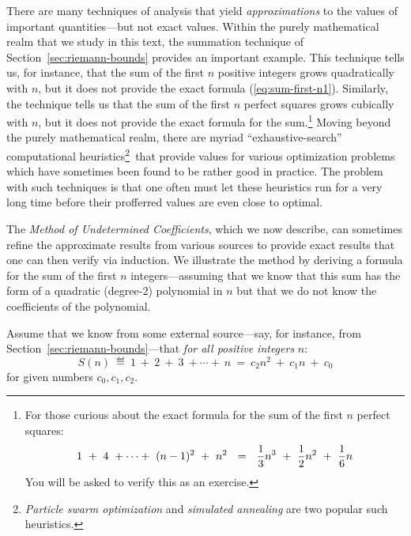 \medskip


There are many techniques of analysis that yield {\em approximations} to the values of important quantities---but not exact values.  Within the purely mathematical realm that we study in this text, the summation technique of Section~\ref{sec:riemann-bounds} provides an important example.  This technique tells us, for instance, that the sum of the first $n$ positive integers grows quadratically with $n$, but it does not provide the exact formula (\ref{eq:sum-first-n1}).   Similarly, the technique tells us that the sum of the first $n$ perfect squares grows cubically with $n$, but it does not provide the exact formula for the sum.\footnote{For those curious about the exact formula for the sum of the first $n$ perfect squares:
\begin{equation}
\label{eq:sum-1-to-nsq1}
1 \ + \ 4 \ + \cdots + \ (n-1)^2 \ + \ n^2 
 \ \ = \ \
{1 \over 3} n^3 \ + \ {1 \over 2} n^2 \ + \ {1 \over 6} n
\end{equation}
You will be asked to verify this as an exercise.}
Moving beyond the purely mathematical realm, there are myriad ``exhaustive-search'' computational heuristics\footnote{{\it Particle swarm optimization} \cite{KennedyE95} and {\it simulated annealing} \cite{KirkpatrickGV83} are two popular such heuristics.}~that provide values for various optimization problems which have sometimes been found to be rather good in practice.  The problem with such techniques is that one often must let these heuristics run for a very long time before their profferred values are even close to optimal.

\medskip

The {\em Method of Undetermined Coefficients}, which we now describe, can sometimes refine the approximate results from various sources to provide exact results that one can then verify via induction.  We illustrate the method by deriving a formula for the sum of the first $n$ integers---assuming that we know that this sum has the form of a quadratic (degree-$2$) polynomial in $n$ but that we do not know the coefficients of the polynomial.

\smallskip

Assume that we know from some external source---say, for instance, from Section~\ref{sec:riemann-bounds}---that {\em for all positive integers} $n$:
\begin{equation}
\label{eq:formula-for-n}
S(n) \ \eqdef \
 1 \ + \ 2 \ + \ 3 \ + \cdots + \ n 
 \ = \ 
c_2 n^2 \ + \ c_1 n \ + \ c_0
\end{equation}
for given numbers $c_0, c_1, c_2$.

